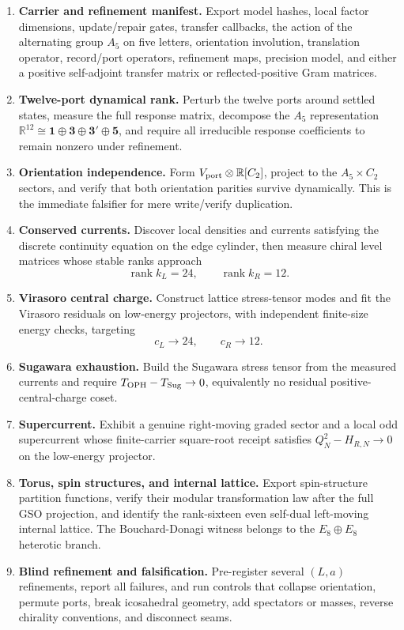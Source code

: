 \documentclass[11pt]{article}
\theoremstyle{remark}
\theoremstyle{plain}
\newcommand{\OPH}{\mathrm{OPH}}
\begin{document}
\begin{enumerate}[leftmargin=2em,label=\textbf{FC-\arabic*.}]
\item \textbf{Carrier and refinement manifest.} Export model hashes, local factor dimensions,
update/repair gates, transfer callbacks, the action of the alternating group
\(A_5\) on five letters, orientation involution, translation
operator, record/port operators, refinement maps, precision model, and either a positive
self-adjoint transfer matrix or reflected-positive Gram matrices.
\item \textbf{Twelve-port dynamical rank.} Perturb the twelve ports around settled states, measure
the full response matrix, decompose the \(A_5\) representation
\(\mathbb R^{12}\cong\mathbf1\oplus\mathbf3\oplus\mathbf3'\oplus\mathbf5\), and require all
irreducible response coefficients to remain nonzero under refinement.
\item \textbf{Orientation independence.} Form
\(V_{\rm port}\otimes\mathbb R[C_2]\), project to the \(A_5\times C_2\) sectors, and verify that
both orientation parities survive dynamically. This is the immediate falsifier for mere
write/verify duplication.
\item \textbf{Conserved currents.} Discover local densities and currents satisfying the discrete
continuity equation on the edge cylinder, then measure chiral level matrices whose stable ranks
approach
\[
\operatorname{rank}k_L=24,\qquad \operatorname{rank}k_R=12.
\]
\item \textbf{Virasoro central charge.} Construct lattice stress-tensor modes and fit the
Virasoro residuals on low-energy projectors, with independent finite-size energy checks, targeting
\[
c_L\to24,\qquad c_R\to12.
\]
\item \textbf{Sugawara exhaustion.} Build the Sugawara stress tensor from the measured currents
and require \(T_{\OPH}-T_{\rm Sug}\to0\), equivalently no residual positive-central-charge coset.
\item \textbf{Supercurrent.} Exhibit a genuine right-moving graded sector and a local odd
supercurrent whose finite-carrier square-root receipt satisfies \(Q_N^2-H_{R,N}\to0\) on the
low-energy projector.
\item \textbf{Torus, spin structures, and internal lattice.} Export spin-structure partition
functions, verify their modular transformation law after the full GSO projection, and identify the
rank-sixteen even self-dual left-moving internal lattice. The Bouchard-Donagi witness belongs to
the \(E_8\oplus E_8\) heterotic branch.
\item \textbf{Blind refinement and falsification.} Pre-register several \((L,a)\) refinements,
report all failures, and run controls that collapse orientation, permute ports, break icosahedral
geometry, add spectators or masses, reverse chirality conventions, and disconnect seams.
\end{enumerate}
\end{document}
